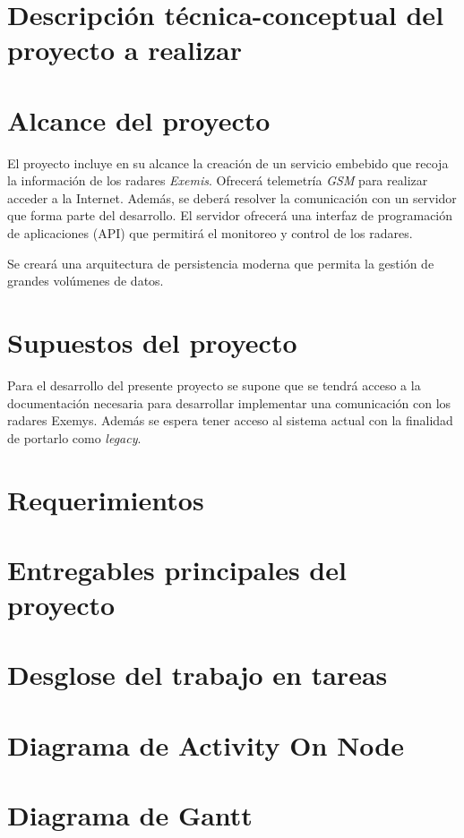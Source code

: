 \documentclass[
12pt,
spanish,
singlespacing,
parskip,
headsepline,]{article}
\begin{document}
\section{Descripción técnica-conceptual del proyecto a realizar}

\section{Alcance del proyecto}

El proyecto incluye en su alcance la creación de un servicio embebido que recoja la información de los radares \emph{Exemis}.
Ofrecerá telemetría \emph{GSM} para realizar acceder a la Internet.
Además, se deberá resolver la comunicación con un servidor que forma parte del desarrollo.
El servidor ofrecerá una interfaz de programación de aplicaciones (API) que permitirá el monitoreo y control de los radares.

Se creará una arquitectura de persistencia moderna que permita la gestión de grandes volúmenes de datos.


\section{Supuestos del proyecto}

Para el desarrollo del presente proyecto se supone que se tendrá acceso a la documentación necesaria para desarrollar implementar una comunicación con los radares Exemys.
Además se espera tener acceso al sistema actual con la finalidad de portarlo como \emph{legacy}.

\section{Requerimientos}

\section{Entregables principales del proyecto}

\section{Desglose del trabajo en tareas}

\section{Diagrama de Activity On Node}

\section{Diagrama de Gantt}
\end{document}
